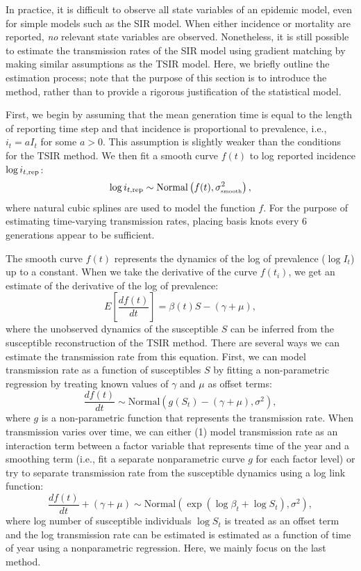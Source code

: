 \documentclass{article}
\newcommand{\tsub}[2]{#1_{{\textrm{\tiny #2}}}}
\begin{document}
In practice, it is difficult to observe all state variables of an epidemic model, even for simple models such as the SIR model.
When either incidence or mortality are reported, \emph{no} relevant state variables are observed.
Nonetheless, it is still possible to estimate the transmission rates of the SIR model using gradient matching by making similar assumptions as the TSIR model.
Here, we briefly outline the estimation process;
note that the purpose of this section is to introduce the method, rather than to provide a rigorous justification of the statistical model.

First, we begin by assuming that the mean generation time is equal to the length of reporting time step and that incidence is proportional to prevalence, i.e., $i_t = a I_t$ for some $a > 0$. 
This assumption is slightly weaker than the conditions for the TSIR method.
We then fit a smooth curve $f(t)$ to log reported incidence $\log i_{t, {\tiny \textrm{rep}}}$:
\begin{equation}
\log i_{t, {\tiny \textrm{rep}}} \sim \mathrm{Normal}\left(f(t), \tsub{\sigma}{smooth}^2 \right),
\end{equation}
where natural cubic splines are used to model the function $f$.
For the purpose of estimating time-varying transmission rates, placing basis knots every 6 generations appear to be sufficient.

The smooth curve $f(t)$ represents the dynamics of the log of prevalence ($\log I_t$) up to a constant.
When we take the derivative of the curve $f(t_i)$, we get an estimate of the derivative of the log of prevalence:
\begin{equation}
E\left[\frac{df(t)}{dt}\right] = \beta(t) S - (\gamma + \mu),
\end{equation}
where the unobserved dynamics of the susceptible $S$ can be inferred from the susceptible reconstruction of the TSIR method.
There are several ways we can estimate the transmission rate from this equation.
First, we can model transmission rate as a function of susceptibles $S$ by fitting a non-parametric regression by treating known values of $\gamma$ and $\mu$ as offset terms:
\begin{equation}
\frac{df(t)}{dt} \sim \mathrm{Normal}(g(S_t) - (\gamma + \mu), \sigma^2),
\end{equation}
where $g$ is a non-parametric function that represents the transmission rate.
When transmission varies over time, we can either (1) model transmission rate as an interaction term between a factor variable that represents time of the year and a smoothing term (i.e., fit a separate nonparametric curve $g$ for each factor level) or try to separate transmission rate from the susceptible dynamics using a log link function:
\begin{equation}
\frac{d f(t)}{dt} + (\gamma + \mu) \sim \mathrm{Normal}\left(\exp \left(\log \beta_t + \log S_t\right), \sigma^2\right),
\end{equation}
where log number of susceptible individuals $\log S_t$ is treated as an offset term and the log transmission rate can be estimated is estimated as a function of time of year using a nonparametric regression.
Here, we mainly focus on the last method.
\end{document}
